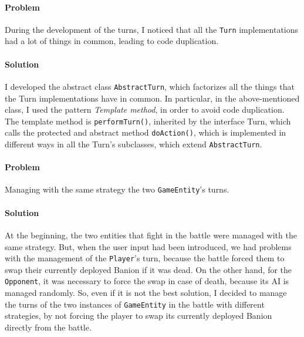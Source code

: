 \documentclass[12pt, a4paper]{report}
\theoremstyle{definition}
\begin{document}
            \paragraph{Problem}

            During the development of the turns, I noticed that all the \verb|Turn| implementations had a lot of things in
            common, leading to code duplication.

            \paragraph{Solution}

            I developed the abstract class \verb|AbstractTurn|, which factorizes all the things that the Turn implementations have in common.
            In particular, in the above-mentioned class, I used the pattern \emph{Template method}, in order to avoid code duplication.
            The template method is \verb|performTurn()|, inherited by the interface Turn, which calls the protected and abstract 
            method \verb|doAction()|, which is implemented in different ways in all the Turn's subclasses, which extend \verb|AbstractTurn|.

            \paragraph{Problem}

            Managing with the same strategy the two \verb|GameEntity|'s turns.

            \paragraph{Solution}

            At the beginning, the two entities that fight in the battle were managed with the same strategy. But, when the user input had
            been introduced, we had problems with the management of the \verb|Player|'s turn, because the battle forced them to swap their
            currently deployed Banion if it was dead. On the other hand, for the \verb|Opponent|, it was necessary to force the swap 
            in case of death, because its AI is managed randomly. So, even if it is not the best solution, I decided to manage the turns 
            of the two instances of \verb|GameEntity| in the battle with different strategies, by not forcing the player to swap its currently 
            deployed Banion directly from the battle.
\end{document}
